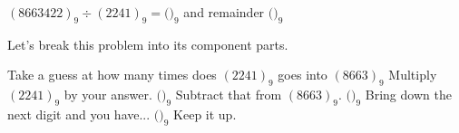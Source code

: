 \documentclass[handout,numbers]{ximera}
\begin{document}
\begin{question}
	$(8663422)_9\div (2241)_9 = ($\qquad\qquad {}$)_9$ and remainder $($\qquad\qquad {}$)_9$
	\begin{hint} 
		Let's break this problem into its component parts.

		\begin{prompt} 
			Take a guess at how many times does $(2241)_9$ goes into $(8663)_9$ 
			Multiply $(2241)_9$ by your answer.  $($\qquad\qquad {}$)_9$
			Subtract that from $(8663)_9$.  $($\qquad\qquad {}$)_9$
			Bring down the next digit and you have... $($\qquad\qquad {}$)_9$
			Keep it up.
		\end{prompt}
	\end{hint}
\end{question}
\end{document}
